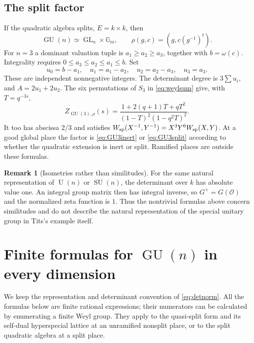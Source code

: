 \documentclass[11pt,a4paper]{article}
\theoremstyle{definition}
\newtheorem{remark}[proposition]{Remark}
\newcommand{\Gm}{\mathbb G_m}
\newcommand{\OO}{\mathcal O}
\newcommand{\GU}{\operatorname{GU}}
\newcommand{\SU}{\operatorname{SU}}
\newcommand{\UU}{\operatorname U}
\newcommand{\GL}{\operatorname{GL}}
\begin{document}
\subsection{The split factor}
If the quadratic algebra splits, $E=k\times k$, then
\[
 \GU(n)\simeq\GL_n\times\Gm,\qquad
 \rho(g,c)=(g,c(g^{-1})^t).
\]
For $n=3$ a dominant valuation tuple is
$a_1\geq a_2\geq a_3$, together with $b=\omega(c)$.
Integrality requires $0\leq a_3\leq a_2\leq a_1\leq b$.
Set
\[
 u_0=b-a_1,\quad u_1=a_1-a_2,\quad
 u_2=a_2-a_3,\quad u_3=a_3.
\]
These are independent nonnegative integers. The determinant degree is
$3\sum u_i$, and $A=2u_1+2u_2$. The six permutations of $S_3$
in \eqref{eq:weylsum} give, with $T=q^{-3s}$,
\begin{equation}\label{eq:GU3split}
 \boxed{Z_{\GU(3),\rho}(s)=
 \frac{1+2(q+1)T+qT^2}{(1-T)^2(1-q^2T)^2}}.
\end{equation}
It too has abscissa $2/3$ and satisfies
$W_{\rm sp}(X^{-1},Y^{-1})=X^3Y^6W_{\rm sp}(X,Y)$.
At a good global place the factor is \eqref{eq:GU3inert} or
\eqref{eq:GU3split} according to whether the quadratic extension is
inert or split. Ramified places are outside these formulas.

\begin{remark}[Isometries rather than similitudes]
For the same natural representation of $\UU(n)$ or $\SU(n)$, the
determinant over $k$ has absolute value one. An integral group matrix
then has integral inverse, so $G^+=G(\OO)$ and the normalized zeta
function is $1$. Thus the nontrivial formulas above concern
similitudes and do not describe the natural representation of the
special unitary group in Tits's example itself.
\end{remark}

\section{Finite formulas for \texorpdfstring{$\GU(n)$}{GU(n)} in every dimension}\label{sec:GUn}
We keep the representation and determinant convention of
\eqref{eq:detnorm}. All the formulas below are finite rational
expressions; their numerators can be calculated by enumerating a finite
Weyl group. They apply to the quasi-split form and its self-dual
hyperspecial lattice at an unramified nonsplit place, or to the split
quadratic algebra at a split place.
\end{document}
